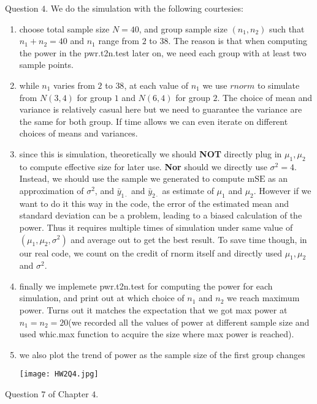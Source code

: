 \documentclass[11pt]{article}
\begin{document}
Question $4$.
We do the simulation with the following courtesies:
\begin{enumerate}
	\item choose total sample size $N = 40$, and group sample size $(n_1, n_2)$ such that $n_1 + n_2 = 40$ and $n_1$ range from $2$ to $38$. The reason is that when computing the power in the pwr.t2n.test later on, we need each group with at least two sample points.
	\item  while $n_1$ varies from $2$ to $38$, at each value of $n_1$ we use $rnorm$ to simulate from $N(3, 4)$ for group $1$ and $N(6, 4)$ for group $2$. The choice of mean and variance is relatively casual here but we need to guarantee the variance are the same for both group. If time allows we can even iterate on different choices of means and variances.
	\item since this is simulation, theoretically we should {\bf NOT} directly plug in $\mu_1, \mu_2$ to compute effective size for later use. {\bf Nor} should we directly use $\sigma^2 = 4$. Instead, we should use the sample we generated to compute $\text{mSE}$ as an approximation of $\sigma^2$, and $\bar{y}_{1\cdot}$ and $\bar{y}_{2\cdot}$ as estimate of $\mu_1$ and $\mu_2$. However if we want to do it this way in the code, the error of the estimated mean and standard deviation can be a problem, leading to a biased calculation of the power. Thus it requires multiple times of simulation under same value of $(\mu_1, \mu_2, \sigma^2)$ and average out to get the best result. To save time though, in our real code, we count on the credit of rnorm itself and directly used $\mu_1, \mu_2$ and $\sigma^2$.
	\item finally we implemete pwr.t2n.test for computing the power for each simulation, and print out at which choice of $n_1$ and $n_2$ we reach maximum power. Turns out it matches the expectation that we got max power at $n_1 = n_2  = 20$(we recorded all the values of power at different sample size and used whic.max function to acquire the size where max power is reached).\vskip 2mm
	\item we also plot the trend of power as the sample size of the first group changes
	\begin{center}
		\texttt{[image: HW2Q4.jpg]}
	\end{center}
\end{enumerate}
Question $7$ of Chapter $4$.
\end{document}
